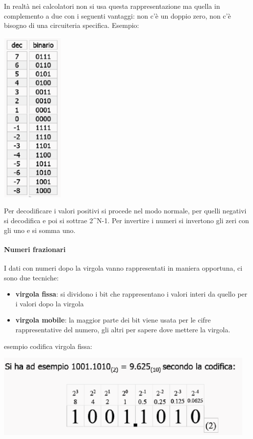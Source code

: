 \documentclass[
  paper=a4,
  oneside  ,captions=tableheading
]{scrbook}
\providecommand{\tightlist}{%
  \setlength{\itemsep}{0pt}\setlength{\parskip}{0pt}}
\begin{document}
In realtà nei calcolatori non si usa questa rappresentazione ma quella
in complemento a due con i seguenti vantaggi: non c'è un doppio zero,
non c'è bisogno di una circuiteria specifica. Esempio:

\includegraphics{./image/image-20201212111232217.png}

Per decodificare i valori positivi si procede nel modo normale, per
quelli negativi si decodifica e poi si sottrae 2\^{}N-1. Per invertire i
numeri si invertono gli zeri con gli uno e si somma uno.

\hypertarget{numeri-frazionari}{%
\paragraph{Numeri frazionari}\label{numeri-frazionari}}

I dati con numeri dopo la virgola vanno rappresentati in maniera
opportuna, ci sono due tecniche:

\begin{itemize}
\tightlist
\item
  \textbf{virgola fissa}: si dividono i bit che rappresentano i valori
  interi da quello per i valori dopo la virgola
\item
  \textbf{virgola mobile}: la maggior parte dei bit viene usata per le
  cifre rappresentative del numero, gli altri per sapere dove mettere la
  virgola.
\end{itemize}

esempio codifica virgola fissa:

\includegraphics{./image/image-20201212112345743.png}
\end{document}
